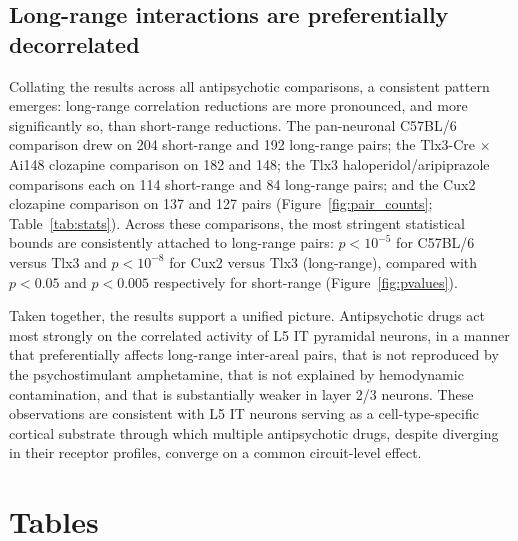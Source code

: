 \documentclass[11pt]{article}
\begin{document}
\subsection{Long-range interactions are preferentially decorrelated}

Collating the results across all antipsychotic comparisons, a consistent pattern emerges: long-range correlation reductions are more pronounced, and more significantly so, than short-range reductions. The pan-neuronal C57BL/6 comparison drew on 204 short-range and 192 long-range pairs; the Tlx3-Cre $\times$ Ai148 clozapine comparison on 182 and 148; the Tlx3 haloperidol/aripiprazole comparisons each on 114 short-range and 84 long-range pairs; and the Cux2 clozapine comparison on 137 and 127 pairs (Figure~\ref{fig:pair_counts}; Table~\ref{tab:stats}). Across these comparisons, the most stringent statistical bounds are consistently attached to long-range pairs: $p<10^{-5}$ for C57BL/6 versus Tlx3 and $p<10^{-8}$ for Cux2 versus Tlx3 (long-range), compared with $p<0.05$ and $p<0.005$ respectively for short-range (Figure~\ref{fig:pvalues}).

Taken together, the results support a unified picture. Antipsychotic drugs act most strongly on the correlated activity of L5 IT pyramidal neurons, in a manner that preferentially affects long-range inter-areal pairs, that is not reproduced by the psychostimulant amphetamine, that is not explained by hemodynamic contamination, and that is substantially weaker in layer 2/3 neurons. These observations are consistent with L5 IT neurons serving as a cell-type-specific cortical substrate through which multiple antipsychotic drugs, despite diverging in their receptor profiles, converge on a common circuit-level effect.

\section{Tables}
\end{document}
